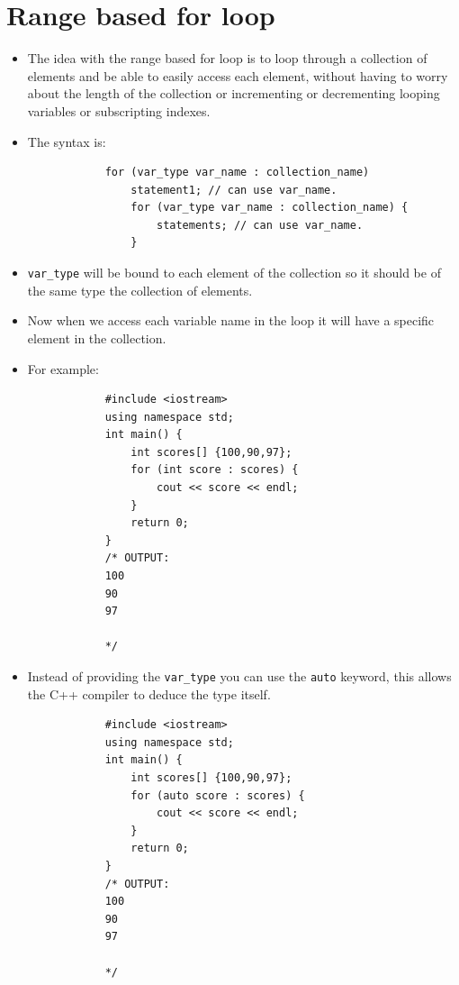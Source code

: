 \section{Range based for loop}
\begin{itemize}
    \item The idea with the range based for loop is to loop through a collection of elements and be able to easily access each element, without having to worry about the length of the collection or incrementing or decrementing looping variables or subscripting indexes. 
    \item The syntax is: 
        \begin{verbatim}
            for (var_type var_name : collection_name) 
                statement1; // can use var_name.
                for (var_type var_name : collection_name) {
                    statements; // can use var_name.
                }
        \end{verbatim}
    \item \verb|var_type| will be bound to each element of the collection so it should be of the same type the collection of elements.
    \item Now when we access each variable name in the loop it will have a specific element in the collection.
    \item For example:
        \begin{verbatim}
            #include <iostream>
            using namespace std;
            int main() {
                int scores[] {100,90,97};
                for (int score : scores) {
                    cout << score << endl;
                }
                return 0;
            }
            /* OUTPUT:
            100
            90
            97

            */
        \end{verbatim}
    
    \item Instead of providing the \verb|var_type| you can use the \texttt{auto} keyword, this allows the C++ compiler to deduce the type itself.
        \begin{verbatim}
            #include <iostream>
            using namespace std;
            int main() {
                int scores[] {100,90,97};
                for (auto score : scores) {
                    cout << score << endl;
                }
                return 0;
            }
            /* OUTPUT:
            100
            90
            97

            */
        \end{verbatim}
\end{itemize}

